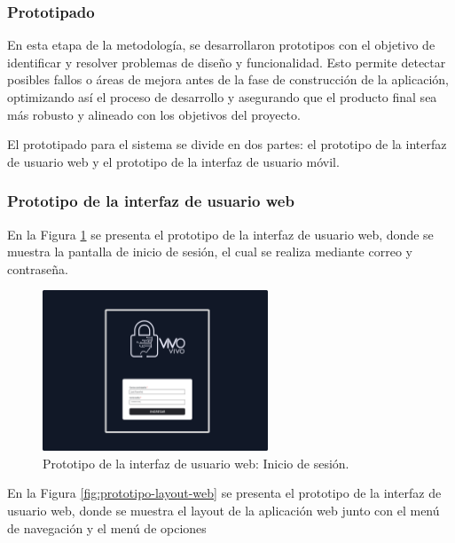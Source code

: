 \subsubsection{Prototipado}

En esta etapa de la metodología, se desarrollaron prototipos con el objetivo de identificar y resolver problemas de diseño y funcionalidad.
Esto permite detectar posibles fallos o áreas de mejora antes de la fase de construcción de la aplicación, optimizando así el proceso de
desarrollo y asegurando que el producto final sea más robusto y alineado con los objetivos del proyecto.

El prototipado para el sistema se divide en dos partes: el prototipo de la interfaz de usuario web y el prototipo de la interfaz de usuario móvil.

\subsubsection{Prototipo de la interfaz de usuario web}

En la Figura \ref{fig:prototipo-inicio-sesion-web} se presenta el prototipo de la interfaz de usuario web, donde se muestra la pantalla de inicio de sesión,
el cual se realiza mediante correo y contraseña.

\begin{figure}[H]
    \centering
    \includegraphics[width=0.6\textwidth]{chapters/III-resultados-y-discusion/resources/images/prototipo-inicio-sesion-web.png}
    \caption{Prototipo de la interfaz de usuario web: Inicio de sesión.}
    \label{fig:prototipo-inicio-sesion-web}
\end{figure}

En la Figura \ref{fig:prototipo-layout-web} se presenta el prototipo de la interfaz de usuario web, donde se muestra el layout de la aplicación web junto
con el menú de navegación y el menú de opciones

